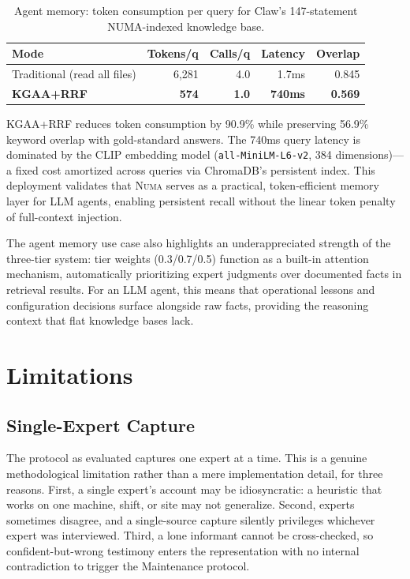 \documentclass[11pt,a4paper]{article}
\begin{document}
\begin{table}[ht]
\centering
\caption{Agent memory: token consumption per query for Claw's 147-statement NUMA-indexed knowledge base.}
\label{tab:agent}
\begin{tabular}{lrrrr}
\hline
\textbf{Mode} & \textbf{Tokens/q} & \textbf{Calls/q} & \textbf{Latency} & \textbf{Overlap} \\
\hline
Traditional (read all files) & 6,281 & 4.0 & 1.7ms & 0.845 \\
\textbf{KGAA+RRF} & \textbf{574} & \textbf{1.0} & \textbf{740ms} & \textbf{0.569} \\
\hline
\end{tabular}
\end{table}

KGAA+RRF reduces token consumption by 90.9\% while preserving 56.9\% keyword overlap with gold-standard answers. The 740ms query latency is dominated by the CLIP embedding model (\texttt{all-MiniLM-L6-v2}, 384 dimensions)---a fixed cost amortized across queries via ChromaDB's persistent index. This deployment validates that \textsc{Numa} serves as a practical, token-efficient memory layer for LLM agents, enabling persistent recall without the linear token penalty of full-context injection.

The agent memory use case also highlights an underappreciated strength of the three-tier system: tier weights (0.3/0.7/0.5) function as a built-in attention mechanism, automatically prioritizing expert judgments over documented facts in retrieval results. For an LLM agent, this means that operational lessons and configuration decisions surface alongside raw facts, providing the reasoning context that flat knowledge bases lack.

\section{Limitations}

\subsection{Single-Expert Capture}

The protocol as evaluated captures one expert at a time. This is a genuine methodological limitation rather than a mere implementation detail, for three reasons. First, a single expert's account may be idiosyncratic: a heuristic that works on one machine, shift, or site may not generalize. Second, experts sometimes disagree, and a single-source capture silently privileges whichever expert was interviewed. Third, a lone informant cannot be cross-checked, so confident-but-wrong testimony enters the representation with no internal contradiction to trigger the Maintenance protocol.
\end{document}
